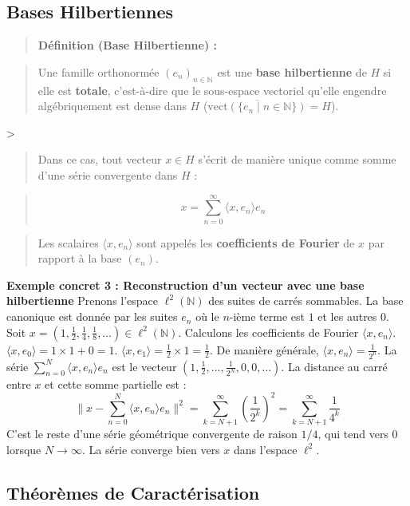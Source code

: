 \documentclass[11pt,a4paper]{article}
\begin{document}
\subsection{Bases Hilbertiennes}

\begin{quote}\textbf{Définition (Base Hilbertienne) :}\end{quote}
\begin{quote}Une famille orthonormée $(e_n)_{n \in \mathbb{N}}$ est une \textbf{base hilbertienne} de $H$ si elle est \textbf{totale}, c'est-à-dire que le sous-espace vectoriel qu'elle engendre algébriquement est dense dans $H$ ($\overline{\text{vect}(\{e_n \mid n \in \mathbb{N}\})} = H$).\end{quote}
>
\begin{quote}Dans ce cas, tout vecteur $x \in H$ s'écrit de manière unique comme somme d'une série convergente dans $H$ :\end{quote}
\begin{quote}$$x = \sum_{n=0}^\infty \langle x, e_n \rangle e_n$$\end{quote}
\begin{quote}Les scalaires $\langle x, e_n \rangle$ sont appelés les \textbf{coefficients de Fourier} de $x$ par rapport à la base $(e_n)$.\end{quote}

\textbf{Exemple concret 3 : Reconstruction d'un vecteur avec une base hilbertienne}
Prenons l'espace $\ell^2(\mathbb{N})$ des suites de carrés sommables. La base canonique est donnée par les suites $e_n$ où le $n$-ième terme est $1$ et les autres $0$.
Soit $x = (1, \frac{1}{2}, \frac{1}{4}, \frac{1}{8}, \dots) \in \ell^2(\mathbb{N})$.
Calculons les coefficients de Fourier $\langle x, e_n \rangle$.
$\langle x, e_0 \rangle = 1 \times 1 + 0 = 1$.
$\langle x, e_1 \rangle = \frac{1}{2} \times 1 = \frac{1}{2}$.
De manière générale, $\langle x, e_n \rangle = \frac{1}{2^n}$.
La série $\sum_{n=0}^N \langle x, e_n \rangle e_n$ est le vecteur $(1, \frac{1}{2}, \dots, \frac{1}{2^N}, 0, 0, \dots)$.
La distance au carré entre $x$ et cette somme partielle est :
$$ \| x - \sum_{n=0}^N \langle x, e_n \rangle e_n \|^2 = \sum_{k=N+1}^\infty \left(\frac{1}{2^k}\right)^2 = \sum_{k=N+1}^\infty \frac{1}{4^k} $$
C'est le reste d'une série géométrique convergente de raison $1/4$, qui tend vers $0$ lorsque $N \to \infty$. La série converge bien vers $x$ dans l'espace $\ell^2$.

\subsection{Théorèmes de Caractérisation}
\end{document}

